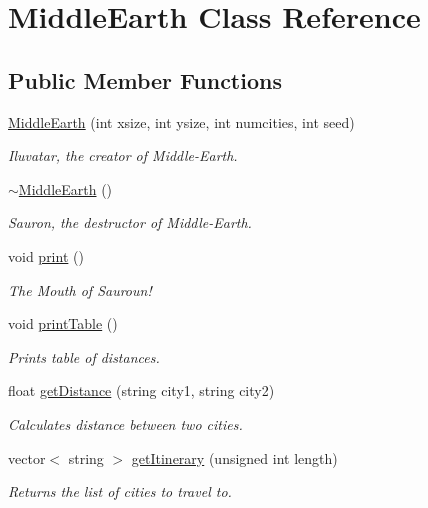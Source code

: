 \hypertarget{classMiddleEarth}{\section{Middle\+Earth Class Reference}
\label{classMiddleEarth}
}
\subsection*{Public Member Functions}
\begin{DoxyCompactItemize}
\item 
\hyperlink{classMiddleEarth_ab7f5e0c9a33827812f435042e41e7800}{Middle\+Earth} (int xsize, int ysize, int numcities, int seed)
\begin{DoxyCompactList}\small\item\em Iluvatar, the creator of Middle-\/\+Earth. \end{DoxyCompactList}\item 
\hyperlink{classMiddleEarth_a617999df0571c3d96b204feb224731eb}{$\sim$\+Middle\+Earth} ()
\begin{DoxyCompactList}\small\item\em Sauron, the destructor of Middle-\/\+Earth. \end{DoxyCompactList}\item 
void \hyperlink{classMiddleEarth_a5cb0956acbe5e39525e5061c9f3cc79b}{print} ()
\begin{DoxyCompactList}\small\item\em The Mouth of Sauroun! \end{DoxyCompactList}\item 
void \hyperlink{classMiddleEarth_ae724794944d0ade7854047e779eb7054}{print\+Table} ()
\begin{DoxyCompactList}\small\item\em Prints table of distances. \end{DoxyCompactList}\item 
float \hyperlink{classMiddleEarth_af558c23fd240638847105737faf755a3}{get\+Distance} (string city1, string city2)
\begin{DoxyCompactList}\small\item\em Calculates distance between two cities. \end{DoxyCompactList}\item 
vector$<$ string $>$ \hyperlink{classMiddleEarth_ad730d037c3946ec1129657fc5e0cb353}{get\+Itinerary} (unsigned int length)
\begin{DoxyCompactList}\small\item\em Returns the list of cities to travel to. \end{DoxyCompactList}\end{DoxyCompactItemize}

